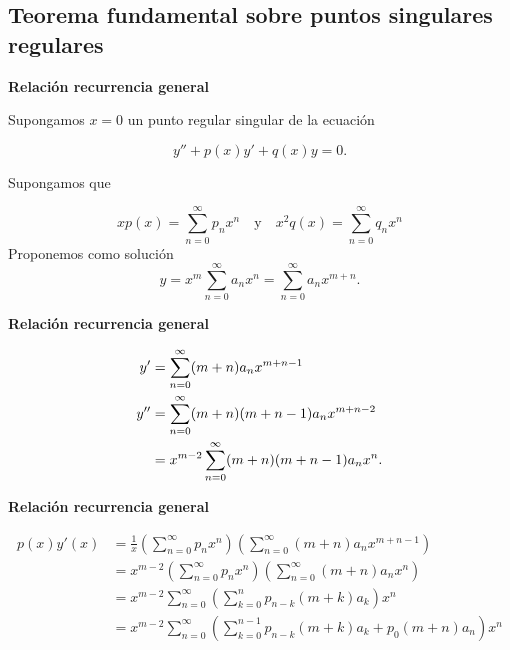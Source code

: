 \subsection{Teorema fundamental sobre puntos singulares regulares}

\begin{frame}[fragile]{\textbf{Relación recurrencia general}}

Supongamos $x=0$ un punto regular singular de la ecuación

\begin{equation}\label{eq:dif_2_orden} y''+p(x)y'+q(x)y=0.
\end{equation}

Supongamos que

\[xp(x)=\sum_{n=0}^{\infty}p_nx^n\quad\text{y}\quad x^2q(x)=\sum_{n=0}^{\infty}q_nx^n\]
Proponemos como solución
\[y=x^{m}\sum_{n=0}^{\infty}a_nx^n=\sum_{n=0}^{\infty}a_nx^{m+n}.\]

\end{frame}




\begin{frame}[fragile]{\textbf{Relación recurrencia general}}

\begin{subequations}
    \begin{align}
      y'&=\sum_{n=0}^{\infty}(m+n)a_{n}x^{m+n-1}\\
      y''&=\sum_{n=0}^{\infty}(m+n)(m+n-1)a_{n}x^{m+n-2}\notag\\
&=x^{m-2}\sum_{n=0}^{\infty}(m+n)(m+n-1)a_{n}x^{n}\label{eq:der_seg} .
    \end{align}
  \end{subequations}

\end{frame}




\begin{frame}[fragile]{\textbf{Relación recurrencia general}}  

\begin{equation}\label{eq:der_pri}
  \begin{split}
    p(x)y'(x)&=\frac{1}{x}\left(\sum_{n=0}^{\infty}p_nx^n\right)\left(\sum_{n=0}^{\infty}(m+n)a_{n}x^{m+n-1}\right)\\
&=x^{m-2}\left(\sum_{n=0}^{\infty}p_nx^n\right)\left(\sum_{n=0}^{\infty}(m+n)a_{n}x^{n}\right)\\
&= x^{m-2}\sum_{n=0}^{\infty}\left(\sum_{k=0}^np_{n-k}(m+k)a_k\right)x^n\\
&= x^{m-2}\sum_{n=0}^{\infty}\left(\sum_{k=0}^{n-1}p_{n-k}(m+k)a_k+p_0(m+n)a_n\right)x^n
  \end{split}
\end{equation}


\end{frame}




